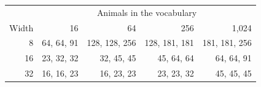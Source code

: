 \begin{tabular}{@{}rrrrr@{}}
\toprule
 & \multicolumn{4}{c}{Animals in the vocabulary} \\
Width & 16 & 64 & 256 & 1{,}024 \\
\midrule
8 & 64, 64, 91 & 128, 128, 256 & 128, 181, 181 & 181, 181, 256 \\
16 & 23, 32, 32 & 32, 45, 45 & 45, 64, 64 & 64, 64, 91 \\
32 & 16, 16, 23 & 16, 23, 23 & 23, 23, 32 & 45, 45, 45 \\
\bottomrule
\end{tabular}
